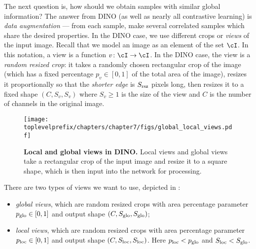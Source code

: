 \documentclass[../../book-main.tex]{subfiles}
\begin{document}
The next question is, how should we obtain samples with similar global information? The answer from DINO (as well as nearly all contrastive learning) is \textit{data augmentation} --- from each sample, make several correlated samples which share the desired properties. In the DINO case, we use different crops or \textit{views} of the input image. Recall that we model an image as an element of the set \(\cI\). In this notation, a view is a function \(v \colon \cI \to \cI\). In the DINO case, the view is a \textit{random resized crop}: it takes a randomly chosen rectangular crop of the image (which has a fixed percentage \(p_{v} \in [0, 1]\) of the total area of the image), resizes it proportionally so that the \textit{shorter edge} is \(S_{\mathrm{rsz}}\) pixels long, then resizes it to a fixed shape \((C, S_{v}, S_{v})\) where \(S_{v} \geq 1\) is the size of the view and \(C\) is the number of channels in the original image. 

\begin{figure}
    \centering 
    \texttt{[image: \\toplevelprefix/chapters/chapter7/figs/global\_local\_views.pdf]}
    \caption{\textbf{Local and global views in DINO.} Local views and global views take a rectangular crop of the input image and resize it to a square shape, which is then input into the network for processing.}
    \label{fig:dino_local_global_views}
\end{figure}

There are two types of views we want to use, depicted in : 
\begin{itemize}
    \item \textit{global views}, which are random resized crops with area percentage parameter \(p_{\mathrm{glo}} \in [0, 1]\) and output shape \((C, S_{\mathrm{glo}}, S_{\mathrm{glo}})\);
    \item \textit{local views}, which are random resized crops with area percentage parameter \(p_{\mathrm{loc}} \in [0, 1]\) and output shape \((C, S_{\mathrm{loc}}, S_{\mathrm{loc}})\). Here \(p_{\mathrm{loc}} < p_{\mathrm{glo}}\) and \(S_{\mathrm{loc}} < S_{\mathrm{glo}}\).
\end{itemize}
\end{document}
